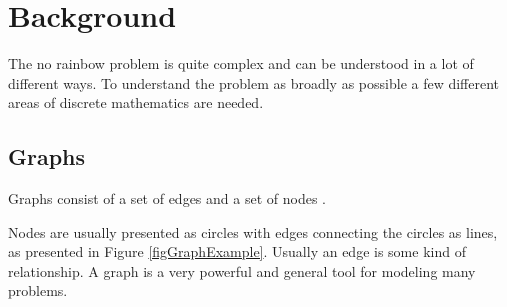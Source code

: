 \documentclass[msc,lith,english]{liuthesis}
\begin{document}
\chapter{Background}
\label{chaBackground}
The no rainbow problem is quite complex and can be understood in a lot of different ways.
To understand the problem as broadly as possible a few different areas of discrete mathematics are needed.

% 
% 
% 
% 
% 

\section{Graphs}
Graphs consist of a set of edges and a set of nodes
\cite[Section 9.1]{sourceArmen}.

Nodes are usually presented as circles with edges connecting the circles as lines, as presented in Figure \ref{figGraphExample}.
Usually an edge is some kind of relationship. 
A graph is a very powerful and general tool for modeling many problems.
\end{document}
